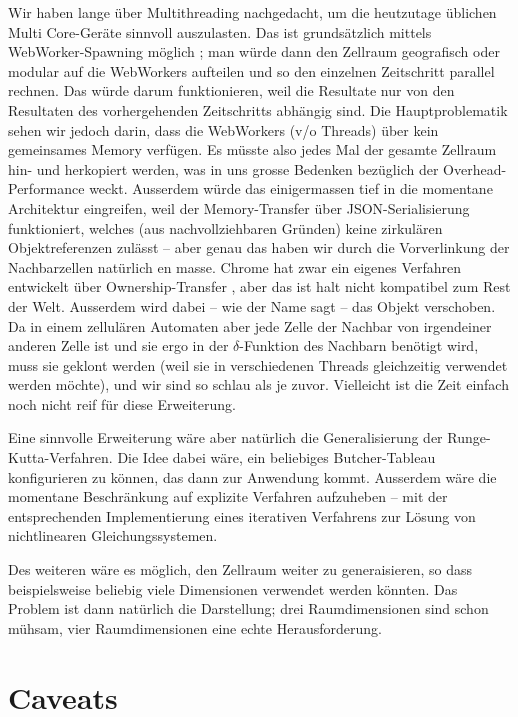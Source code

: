 \documentclass[11pt]{report} %
\theoremstyle{definition}
\begin{document}
Wir haben lange über Multithreading nachgedacht, um die heutzutage üblichen Multi Core-Geräte sinnvoll auszulasten. Das ist grundsätzlich mittels WebWorker-Spawning möglich \cite{mdn:WebWorkers}; man würde dann den Zellraum geografisch oder modular auf die WebWorkers aufteilen und so den einzelnen Zeitschritt parallel rechnen. Das würde darum funktionieren, weil die Resultate nur von den Resultaten des vorhergehenden Zeitschritts abhängig sind. Die Hauptproblematik sehen wir jedoch darin, dass die WebWorkers (v/o Threads)  über kein gemeinsames Memory verfügen. Es müsste also jedes Mal der gesamte Zellraum hin- und herkopiert werden, was in uns grosse Bedenken bezüglich der Overhead-Performance weckt. Ausserdem würde das einigermassen tief in die momentane Architektur eingreifen, weil der Memory-Transfer über JSON-Serialisierung funktioniert, welches (aus nachvollziehbaren Gründen) keine zirkulären Objektreferenzen zulässt -- aber genau das haben wir durch die Vorverlinkung der Nachbarzellen natürlich en masse. Chrome hat zwar ein eigenes Verfahren entwickelt über Ownership-Transfer \cite{lightningFast}, aber das ist halt nicht kompatibel zum Rest der Welt. Ausserdem wird dabei -- wie der Name sagt -- das Objekt verschoben. Da in einem zellulären Automaten aber jede Zelle der Nachbar von irgendeiner anderen Zelle ist und sie ergo in der $\delta$-Funktion des Nachbarn benötigt wird, muss sie geklont werden (weil sie in verschiedenen Threads gleichzeitig verwendet werden möchte), und wir sind so schlau als je zuvor. Vielleicht ist die Zeit einfach noch nicht reif für diese Erweiterung.

Eine sinnvolle Erweiterung wäre aber natürlich die Generalisierung der Runge-Kutta-Verfahren. Die Idee dabei wäre, ein beliebiges Butcher-Tableau konfigurieren zu können, das dann zur Anwendung kommt. Ausserdem wäre die momentane Beschränkung auf explizite Verfahren aufzuheben -- mit der entsprechenden Implementierung eines iterativen Verfahrens zur Lösung von nichtlinearen Gleichungssystemen.

Des weiteren wäre es möglich, den Zellraum weiter zu generaisieren, so dass beispielsweise beliebig viele Dimensionen verwendet werden könnten. Das Problem ist dann natürlich die Darstellung; drei Raumdimensionen sind schon mühsam, vier Raumdimensionen eine echte Herausforderung.

\section{Caveats}
\end{document}
